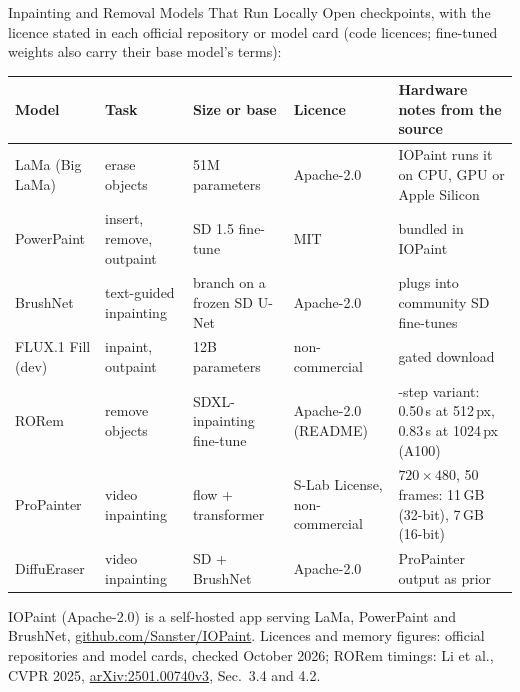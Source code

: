 \begin{frame}{Inpainting and Removal Models That Run Locally}
  Open checkpoints, with the licence stated in each official repository or model card (code licences; fine-tuned weights also carry their base model's terms):\\[0.4em]
  {\centering\scriptsize
  \begin{tabular}{>{\raggedright\arraybackslash}p{2.0cm} >{\raggedright\arraybackslash}p{2.1cm} >{\raggedright\arraybackslash}p{2.3cm} >{\raggedright\arraybackslash}p{2.0cm} >{\raggedright\arraybackslash}p{3.3cm}}
    \toprule
    \textbf{Model} & \textbf{Task} & \textbf{Size or base} & \textbf{Licence} & \textbf{Hardware notes from the source} \\
    \midrule
    LaMa (Big LaMa) & erase objects & 51M parameters & Apache-2.0 & IOPaint runs it on CPU, GPU or Apple Silicon \\
    PowerPaint & insert, remove, outpaint & SD 1.5 fine-tune & MIT & bundled in IOPaint \\
    BrushNet & text-guided inpainting & branch on a frozen SD U-Net & Apache-2.0 & plugs into community SD fine-tunes \\
    FLUX.1 Fill (dev) & inpaint, outpaint & 12B parameters & non-commercial & gated download \\
    RORem & remove objects & SDXL-inpainting fine-tune & Apache-2.0 (README) & 4-step variant: 0.50\,s at 512\,px, 0.83\,s at 1024\,px (A100) \\
    ProPainter & video inpainting & flow + transformer & S-Lab License, non-commercial & $720{\times}480$, 50 frames: 11\,GB (32-bit), 7\,GB (16-bit) \\
    DiffuEraser & video inpainting & SD + BrushNet & Apache-2.0 & ProPainter output as prior \\
    \bottomrule
  \end{tabular}\par}
  \vspace{0.4em}
  {\scriptsize IOPaint (Apache-2.0) is a self-hosted app serving LaMa, PowerPaint and BrushNet, \href{https://github.com/Sanster/IOPaint}{github.com/Sanster/IOPaint}. Licences and memory figures: official repositories and model cards, checked October 2026; RORem timings: Li et al., CVPR 2025, \href{https://arxiv.org/abs/2501.00740v3}{arXiv:2501.00740v3}, Sec.~3.4 and 4.2.\par}
\end{frame}
